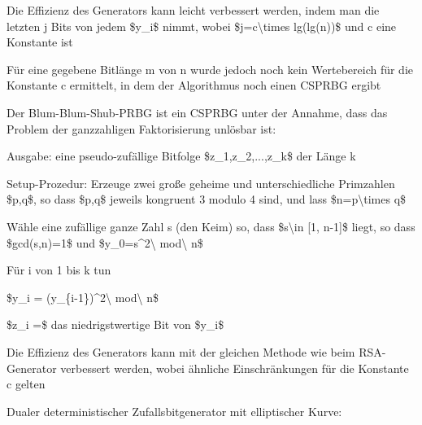 \documentclass[a4paper]{article}
\begin{document}
\begin{multicols}{3}
\begin{itemize*}
            \begin{itemize*}
                  \item Die Effizienz des Generators kann leicht verbessert werden, indem man die letzten j Bits von jedem \$y\_i\$ nimmt, wobei \$j=c\textbackslash times lg(lg(n))\$ und c eine Konstante ist
                  \item Für eine gegebene Bitlänge m von n wurde jedoch noch kein Wertebereich für die Konstante c ermittelt, in dem der Algorithmus noch einen CSPRBG ergibt
            \end{itemize*}
            \item
            Der Blum-Blum-Shub-PRBG ist ein CSPRBG unter der Annahme, dass das
            Problem der ganzzahligen Faktorisierung unlösbar ist:

            \begin{itemize*}
                  \item Ausgabe: eine pseudo-zufällige Bitfolge \$z\_1,z\_2,...,z\_k\$ der Länge k
            \end{itemize*}

            \begin{enumerate*}
                  \def\labelenumi{\arabic{enumi}.}
                  \item Setup-Prozedur: Erzeuge zwei große geheime und unterschiedliche Primzahlen \$p,q\$, so dass \$p,q\$ jeweils kongruent 3 modulo 4 sind, und lass \$n=p\textbackslash times q\$
                  \item Wähle eine zufällige ganze Zahl s (den Keim) so, dass \$s\textbackslash in {[}1, n-1{]}\$ liegt, so dass \$gcd(s,n)=1\$ und \$y\_0=s\^{}2\textbackslash{} mod\textbackslash{} n\$
                  \item Für i von 1 bis k tun
                  \begin{enumerate*} \def\labelenumii{\arabic{enumii}.} \item \$y\_i = (y\_\{i-1\})\^{}2\textbackslash{} mod\textbackslash{} n\$ \item \$z\_i =\$ das niedrigstwertige Bit von \$y\_i\$ \end{enumerate*}
            \end{enumerate*}

            \begin{itemize*}
                  \item Die Effizienz des Generators kann mit der gleichen Methode wie beim RSA-Generator verbessert werden, wobei ähnliche Einschränkungen für die Konstante c gelten
            \end{itemize*}
            \item
            Dualer deterministischer Zufallsbitgenerator mit elliptischer Kurve:


\end{itemize*}
\end{multicols}
\end{document}
